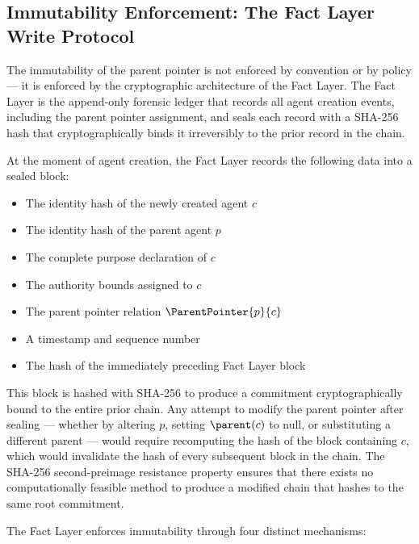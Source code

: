 \subsection{Immutability Enforcement: The Fact Layer Write Protocol}
\label{sec:fact_layer_immutability}

The immutability of the parent pointer is not enforced by convention or by policy --- it is enforced by the cryptographic architecture of the Fact Layer. The Fact Layer is the append-only forensic ledger that records all agent creation events, including the parent pointer assignment, and seals each record with a SHA-256 hash that cryptographically binds it irreversibly to the prior record in the chain.

At the moment of agent creation, the Fact Layer records the following data into a sealed block:
\begin{itemize}
    \item The identity hash of the newly created agent $c$
    \item The identity hash of the parent agent $p$
    \item The complete purpose declaration of $c$
    \item The authority bounds assigned to $c$
    \item The parent pointer relation $\ParentPointer{p}{c}$
    \item A timestamp and sequence number
    \item The hash of the immediately preceding Fact Layer block
\end{itemize}

This block is hashed with SHA-256 to produce a commitment cryptographically bound to the entire prior chain. Any attempt to modify the parent pointer after sealing --- whether by altering $p$, setting $\parent(c)$ to null, or substituting a different parent --- would require recomputing the hash of the block containing $c$, which would invalidate the hash of every subsequent block in the chain. The SHA-256 second-preimage resistance property ensures that there exists no computationally feasible method to produce a modified chain that hashes to the same root commitment.

The Fact Layer enforces immutability through four distinct mechanisms:

